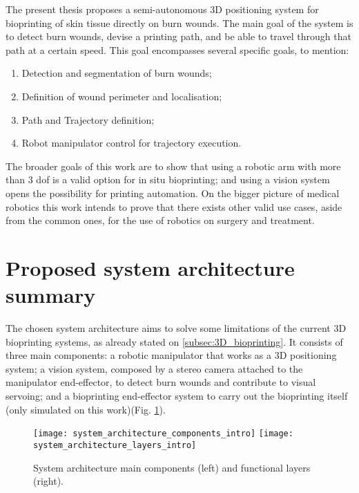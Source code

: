 The present thesis proposes a semi-autonomous 3D positioning system for bioprinting of skin tissue directly on burn wounds. The main goal of the system is to detect burn wounds, devise a printing path, and be able to travel through that path at a certain speed. This goal encompasses several specific goals, to mention:
\begin{enumerate}
    \item Detection and segmentation of burn wounds;
    \item Definition of wound perimeter and localisation;
    \item Path and Trajectory definition;
    \item Robot manipulator control for trajectory execution.
\end{enumerate}
The broader goals of this work are to show that using a robotic arm with more than 3 \gls{dof} is a valid option for in situ bioprinting; and using a vision system opens the possibility for printing automation. On the bigger picture of medical robotics this work intends to prove that there exists other valid use cases, aside from the common ones, for the use of robotics on surgery and treatment.


\section{Proposed system architecture summary} %
\label{sec:proposed_system_architecture_summary}

The chosen system architecture aims to solve some limitations of the current 3D bioprinting systems, as already stated on \ref{subsec:3D_bioprinting}. It consists of three main components: a robotic manipulator that works as a 3D positioning system; a vision system, composed by a stereo camera attached to the manipulator end-effector, to detect burn wounds and contribute to visual servoing; and a bioprinting end-effector system to carry out the bioprinting itself (only simulated on this work)(Fig. \ref{fig:system_architecture_intro}).

\begin{figure}[htbp]
	\centering
	\texttt{[image: system\_architecture\_components\_intro]}
	\hspace{0.1in}
	\texttt{[image: system\_architecture\_layers\_intro]}
	\caption{System architecture main components (left) and functional layers (right).}
	\label{fig:system_architecture_intro}
\end{figure}

